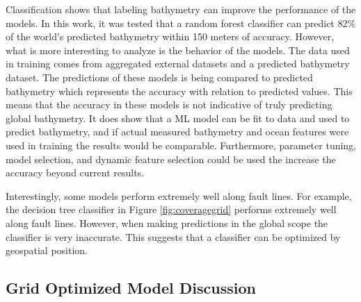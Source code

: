 \par
Classification shows that labeling bathymetry can improve the performance of the models.
In this work, it was tested that a random forest classifier can predict 82\% of the world's predicted bathymetry within 150 meters of accuracy. 
However, what is more interesting to analyze is the behavior of the models.
The data used in training comes from aggregated external datasets and a predicted bathymetry dataset.
The predictions of these models is being compared to predicted bathymetry which represents the accuracy with relation to predicted values.
This means that the accuracy in these models is not indicative of truly predicting global bathymetry.
It does show that a \ac{ML} model can be fit to data and used to predict bathymetry, and if actual measured bathymetry and ocean features were used in training the results would be comparable.
Furthermore, parameter tuning, model selection, and dynamic feature selection could be used the increase the accuracy beyond current results.

\par
Interestingly, some models perform extremely well along fault lines.
For example, the decision tree classifier in Figure \ref{fig:coveragegrid} performs extremely well along fault lines.
However, when making predictions in the global scope the classifier is very inaccurate.
This suggests that a classifier can be optimized by geospatial position.



\subsection{Grid Optimized Model Discussion}


